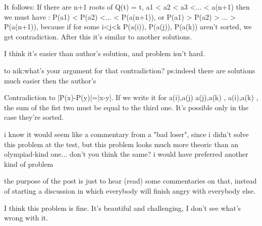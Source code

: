 \begin{solution}
	It follows:
 If there are n+1 roots of Q(t) = t,  a1 < a2 < a3 <... < a(n+1)
then we must have :
 P(a1) < P(a2) <... < P(a(n+1)), 
or P(a1) > P(a2) > ... > P(a(n+1)), 
because if for some i<j<k P(a(i)), P(a(j)), P(a(k))  aren't sorted, we get contradiction. After this it's similar to another solutions.

I think it's easier than author's solution, and problem isn't hard.
\end{solution}



\begin{solution}
	to nik:what's your argument for that contradiction?
ps:indeed there are solutions much easier then the author's
\end{solution}



\begin{solution}
	Contradiction to |P(x)-P(y)|=|x-y|.
If we write it for a(i),a(j)   a(j),a(k) , a(i),a(k) , the sum of the fist two must be equal to the third one. It's possible only in the case they're sorted.
\end{solution}



\begin{solution}
	i know it would seem like a commentary from a "bad loser", since i didn't solve this problem at the test, but this problem looks much more theoric than an olympiad-kind one... don't you think the same? i would have preferred another kind of problem 

the purpose of the post is just to hear (read) some commentaries on that, instead of starting a discussion in which everybody will finish angry with everybody else.
\end{solution}



\begin{solution}
	I think this problem is fine. It's beautiful and challenging, I don't see what's wrong with it.
\end{solution}



